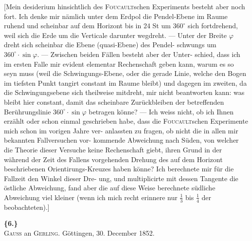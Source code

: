 \documentclass[12pt,a4paper]{article}
\theoremstyle{plain}
\theoremstyle{definition}
\theoremstyle{remark}
\begin{document}
[Mein desiderium hinsichtlich des \textsc{Foucault}schen Experiments besteht
aber noch fort. Ich denke mir n\"amlich unter dem Erdpol die Pendel-Ebene
im Raume ruhend und scheinbar auf dem Horizont bis in 24 St um $360^{\circ}$ sich
fortdrehend, weil sich die Erde um die Verticale darunter wegdreht. ---
Unter der Breite $\varphi$ dreht sich scheinbar die Ebene (quasi-Ebene) des Pendel-
schwungs um $360^{\circ}\cdot\sin\varphi$. --- Zwischen beiden F\"allen besteht aber der Unter-
schied, dass ich im ersten Falle mir evident elementar Rechenschaft geben
kann, warum es so seyn muss (weil die Schwingungs-Ebene, oder die gerade
Linie, welche den Bogen im tiefsten Punkt tangirt constant im Raume
bleibt) und dagegen im zweiten, da die Schwingungsebene sich theilweise
mitdreht, mir nicht beantworten kann: was bleibt hier constant, damit das
scheinbare Zur\"uckbleiben der betreffenden Ber\"uhrungslinie $360^{\circ}\cdot\sin\varphi$ betragen
k\"onne? --- Ich weiss nicht, ob ich Ihnen erz\"ahlt oder schon einmal geschrieben
habe, dass die \textsc{Foucault}schen Experimente mich schon im vorigen Jahre ver-
anlassten zu fragen, ob nicht die in allen mir bekannten Fallversuchen vor-
kommende Abweichung nach S\"uden, von welcher die Theorie dieser Versuche
keine Rechenschaft giebt, ihren Grund in der w\"ahrend der Zeit des Fallens
vorgehenden Drehung des auf dem Horizont beschriebenen Orientirungs-Kreuzes
haben k\"onne? Ich berechnete mir f\"ur die Fallzeit den Winkel dieser Dre-
ung, und multiplicirte mit dessen Tangente die \"ostliche Abweichung, fand
aber die auf diese Weise berechnete s\"udliche Abweichung viel kleiner (wenn
ich mich recht erinnere nur $\frac{1}{3}$ bis $\frac{1}{4}$ der beobachteten).]

\vspace{0.5cm}

\noindent\textbf{\{6.\}}\\
\textsc{Gauss} an \textsc{Gerling}. G\"ottingen, 30. December 1852.

\vspace{0.3cm}
\end{document}
